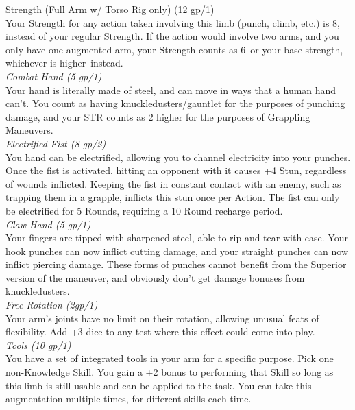 \documentclass[a4paper, twocolumn, openany]{book}
\begin{document}
{	Strength (Full Arm w/ Torso Rig only) (12 gp/1)\\
	Your Strength for any action taken involving this limb (punch, climb, etc.) is 8, instead of your
	regular Strength. If the action would involve two arms, and you only have one augmented arm,
	your Strength counts as 6--or your base strength, whichever is higher--instead.\\

	{\slshape Combat Hand (5 gp/1)\\}
	Your hand is literally made of steel, and can move in ways that a human hand can’t. You count
	as having knuckledusters/gauntlet for the purposes of punching damage, and your STR counts
	as 2 higher for the purposes of Grappling Maneuvers.\\

	{\slshape Electrified Fist (8 gp/2)\\}
	You hand can be electrified, allowing you to channel electricity into your punches. Once the fist
	is activated, hitting an opponent with it causes +4 Stun, regardless of wounds inflicted. Keeping
	the fist in constant contact with an enemy, such as trapping them in a grapple, inflicts this stun
	once per Action. The fist can only be electrified for 5 Rounds, requiring a 10 Round recharge
	period.\\

	{\slshape Claw Hand (5 gp/1)\\}
	Your fingers are tipped with sharpened steel, able to rip and tear with ease. Your hook punches
	can now inflict cutting damage, and your straight punches can now inflict piercing damage.
	These forms of punches cannot benefit from the Superior version of the maneuver, and
	obviously don’t get damage bonuses from knuckledusters.\\

	{\slshape Free Rotation (2gp/1)\\}
	Your arm’s joints have no limit on their rotation, allowing unusual feats of flexibility. Add +3 dice
	to any test where this effect could come into play.\\

	{\slshape Tools (10 gp/1)\\}
	You have a set of integrated tools in your arm for a specific purpose. Pick one non-Knowledge
	Skill. You gain a +2 bonus to performing that Skill so long as this limb is still usable and can be
	applied to the task. You can take this augmentation multiple times, for different skills each time.\\

}
\end{document}
